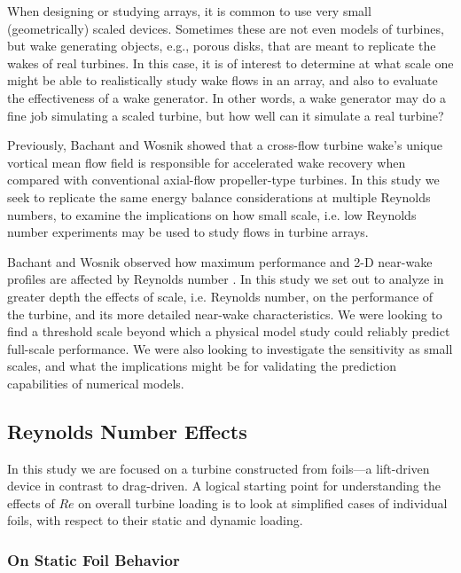 \documentclass[energies,article,accept,moreauthors,pdftex,12pt,a4paper]{mdpi}
\begin{document}
When designing or studying arrays, it is common to use very small
(geometrically) scaled devices. 
Sometimes these are not even models of turbines, but
wake generating objects, e.g., porous disks, that are meant to replicate the
wakes of real turbines. In this case, it is of interest to determine at what
scale one might be able to realistically study wake flows in an array, and also
to evaluate the effectiveness of a wake generator. In other words, a wake
generator may do a fine job simulating a scaled turbine, but how well can it
simulate a real turbine?

Previously, Bachant and Wosnik \cite{Bachant2015-JoT} showed that a cross-flow
turbine wake's unique vortical mean flow field is responsible for accelerated
wake recovery when compared with conventional axial-flow propeller-type
turbines. In this study we seek to replicate the same energy balance
considerations at multiple Reynolds numbers, to examine the implications on how
small scale, i.e. low Reynolds number experiments may be used to study flows in
turbine arrays.

Bachant and Wosnik observed how maximum performance and 2-D near-wake profiles
are affected by Reynolds number \cite{Bachant2014}. In this study we set out to
analyze in greater depth the effects of scale, i.e. Reynolds number, on the
performance of the turbine, and its more detailed near-wake characteristics. We
were looking to find a threshold scale beyond which a physical model study could
reliably predict full-scale performance. We were also looking to investigate the
sensitivity as small scales, and what the implications might be for validating
the prediction capabilities of numerical models.


\subsection{Reynolds Number Effects}

In this study we are focused on a turbine constructed from foils---a lift-driven
device in contrast to drag-driven. A logical starting point for understanding
the effects of $Re$ on overall turbine loading is to look at simplified cases
of individual foils, with respect to their static and dynamic loading. 

\subsubsection{On Static Foil Behavior}
\end{document}
